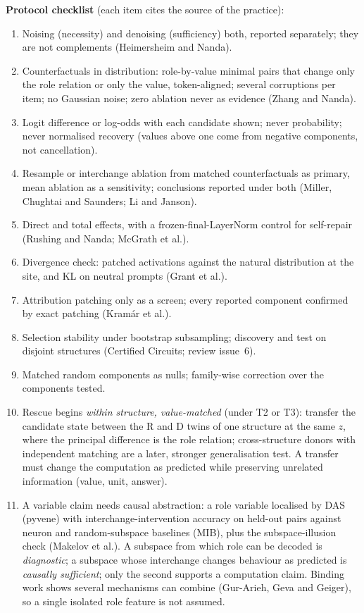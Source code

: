 \documentclass[10pt,a4paper]{article}
\begin{document}
\textbf{Protocol checklist} (each item cites the source of the practice):
\begin{enumerate}
\item Noising (necessity) and denoising (sufficiency) both, reported separately; they are not complements (Heimersheim and Nanda).
\item Counterfactuals in distribution: role-by-value minimal pairs that change only the role relation or only the value, token-aligned; several corruptions per item; no Gaussian noise; zero ablation never as evidence (Zhang and Nanda).
\item Logit difference or log-odds with each candidate shown; never probability; never normalised recovery (values above one come from negative components, not cancellation).
\item Resample or interchange ablation from matched counterfactuals as primary, mean ablation as a sensitivity; conclusions reported under both (Miller, Chughtai and Saunders; Li and Janson).
\item Direct and total effects, with a frozen-final-LayerNorm control for self-repair (Rushing and Nanda; McGrath et al.).
\item Divergence check: patched activations against the natural distribution at the site, and KL on neutral prompts (Grant et al.).
\item Attribution patching only as a screen; every reported component confirmed by exact patching (Kram\'ar et al.).
\item Selection stability under bootstrap subsampling; discovery and test on disjoint structures (Certified Circuits; review issue~6).
\item Matched random components as nulls; family-wise correction over the components tested.
\item Rescue begins \emph{within structure, value-matched} (under T2 or T3): transfer the candidate state between the R and D twins of one structure at the same $z$, where the principal difference is the role relation; cross-structure donors with independent matching are a later, stronger generalisation test. A transfer must change the computation as predicted while preserving unrelated information (value, unit, answer).
\item A variable claim needs causal abstraction: a role variable localised by DAS (pyvene) with interchange-intervention accuracy on held-out pairs against neuron and random-subspace baselines (MIB), plus the subspace-illusion check (Makelov et al.). A subspace from which role can be decoded is \emph{diagnostic}; a subspace whose interchange changes behaviour as predicted is \emph{causally sufficient}; only the second supports a computation claim. Binding work shows several mechanisms can combine (Gur-Arieh, Geva and Geiger), so a single isolated role feature is not assumed.

\end{enumerate}
\end{document}
